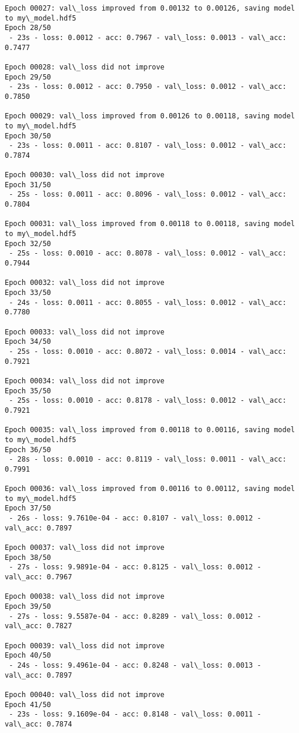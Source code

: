 \documentclass[11pt]{article}
\begin{document}
\begin{Verbatim}[commandchars=\\\{\}]
Epoch 00027: val\_loss improved from 0.00132 to 0.00126, saving model to my\_model.hdf5
Epoch 28/50
 - 23s - loss: 0.0012 - acc: 0.7967 - val\_loss: 0.0013 - val\_acc: 0.7477

Epoch 00028: val\_loss did not improve
Epoch 29/50
 - 23s - loss: 0.0012 - acc: 0.7950 - val\_loss: 0.0012 - val\_acc: 0.7850

Epoch 00029: val\_loss improved from 0.00126 to 0.00118, saving model to my\_model.hdf5
Epoch 30/50
 - 23s - loss: 0.0011 - acc: 0.8107 - val\_loss: 0.0012 - val\_acc: 0.7874

Epoch 00030: val\_loss did not improve
Epoch 31/50
 - 25s - loss: 0.0011 - acc: 0.8096 - val\_loss: 0.0012 - val\_acc: 0.7804

Epoch 00031: val\_loss improved from 0.00118 to 0.00118, saving model to my\_model.hdf5
Epoch 32/50
 - 25s - loss: 0.0010 - acc: 0.8078 - val\_loss: 0.0012 - val\_acc: 0.7944

Epoch 00032: val\_loss did not improve
Epoch 33/50
 - 24s - loss: 0.0011 - acc: 0.8055 - val\_loss: 0.0012 - val\_acc: 0.7780

Epoch 00033: val\_loss did not improve
Epoch 34/50
 - 25s - loss: 0.0010 - acc: 0.8072 - val\_loss: 0.0014 - val\_acc: 0.7921

Epoch 00034: val\_loss did not improve
Epoch 35/50
 - 25s - loss: 0.0010 - acc: 0.8178 - val\_loss: 0.0012 - val\_acc: 0.7921

Epoch 00035: val\_loss improved from 0.00118 to 0.00116, saving model to my\_model.hdf5
Epoch 36/50
 - 28s - loss: 0.0010 - acc: 0.8119 - val\_loss: 0.0011 - val\_acc: 0.7991

Epoch 00036: val\_loss improved from 0.00116 to 0.00112, saving model to my\_model.hdf5
Epoch 37/50
 - 26s - loss: 9.7610e-04 - acc: 0.8107 - val\_loss: 0.0012 - val\_acc: 0.7897

Epoch 00037: val\_loss did not improve
Epoch 38/50
 - 27s - loss: 9.9891e-04 - acc: 0.8125 - val\_loss: 0.0012 - val\_acc: 0.7967

Epoch 00038: val\_loss did not improve
Epoch 39/50
 - 27s - loss: 9.5587e-04 - acc: 0.8289 - val\_loss: 0.0012 - val\_acc: 0.7827

Epoch 00039: val\_loss did not improve
Epoch 40/50
 - 24s - loss: 9.4961e-04 - acc: 0.8248 - val\_loss: 0.0013 - val\_acc: 0.7897

Epoch 00040: val\_loss did not improve
Epoch 41/50
 - 23s - loss: 9.1609e-04 - acc: 0.8148 - val\_loss: 0.0011 - val\_acc: 0.7874


\end{Verbatim}
\end{document}
